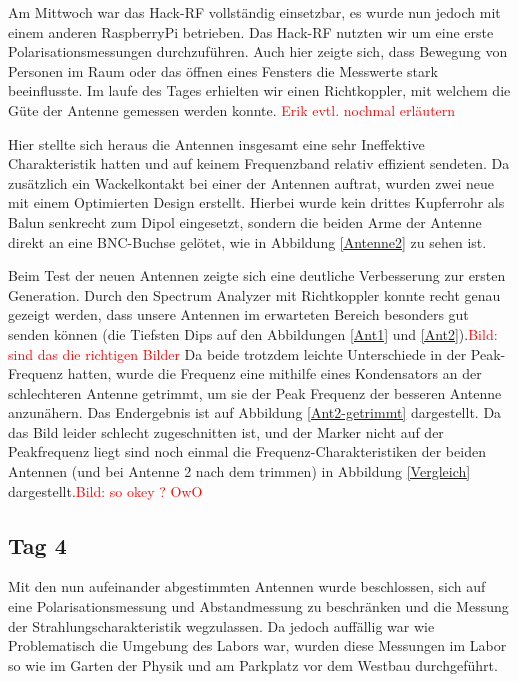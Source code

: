 \documentclass[titlepage,11pt,a4paper,ngerman]{article}
\begin{document}
Am Mittwoch war das Hack-RF vollständig einsetzbar, es wurde nun jedoch mit einem anderen RaspberryPi betrieben. Das Hack-RF nutzten wir um eine erste Polarisationsmessungen durchzuführen. Auch hier zeigte sich, dass Bewegung von Personen im Raum oder das öffnen eines Fensters die Messwerte stark beeinflusste. Im laufe des Tages erhielten wir einen Richtkoppler, mit welchem die Güte der Antenne gemessen werden konnte. \textcolor{red}{Erik evtl. nochmal erläutern}\par
Hier stellte sich heraus die Antennen insgesamt eine sehr Ineffektive Charakteristik hatten und auf keinem Frequenzband relativ effizient sendeten. Da zusätzlich ein Wackelkontakt bei einer der Antennen auftrat, wurden zwei neue mit einem Optimierten Design erstellt. Hierbei wurde kein drittes Kupferrohr als Balun senkrecht zum Dipol eingesetzt, sondern die beiden Arme der Antenne direkt an eine BNC-Buchse gelötet, wie in Abbildung \ref{Antenne2} zu sehen ist.\par
Beim Test der neuen Antennen zeigte sich eine deutliche Verbesserung zur ersten Generation. Durch den Spectrum Analyzer mit Richtkoppler konnte recht genau gezeigt werden, dass unsere Antennen im erwarteten Bereich besonders gut senden können (die Tiefsten Dips auf den Abbildungen \ref{Ant1} und \ref{Ant2}).\textcolor{red}{Bild: sind das die richtigen Bilder} Da beide trotzdem leichte Unterschiede in der Peak-Frequenz hatten, wurde die Frequenz eine mithilfe eines Kondensators an der schlechteren Antenne getrimmt, um sie der Peak Frequenz der besseren Antenne anzunähern. Das Endergebnis ist auf Abbildung \ref{Ant2-getrimmt} dargestellt. Da das Bild leider schlecht zugeschnitten ist, und der Marker nicht auf der Peakfrequenz liegt sind noch einmal die Frequenz-Charakteristiken der beiden Antennen (und bei Antenne 2 nach dem trimmen) in Abbildung \ref{Vergleich} dargestellt.\textcolor{red}{Bild: so okey ? OwO} 

\subsection{Tag 4}

Mit den nun aufeinander abgestimmten Antennen wurde beschlossen, sich auf eine  Polarisationsmessung und Abstandmessung zu beschränken und die Messung der Strahlungscharakteristik wegzulassen. Da jedoch auffällig war wie Problematisch die Umgebung des Labors war, wurden diese Messungen im Labor so wie im Garten der Physik und am Parkplatz vor dem Westbau durchgeführt.
\end{document}
